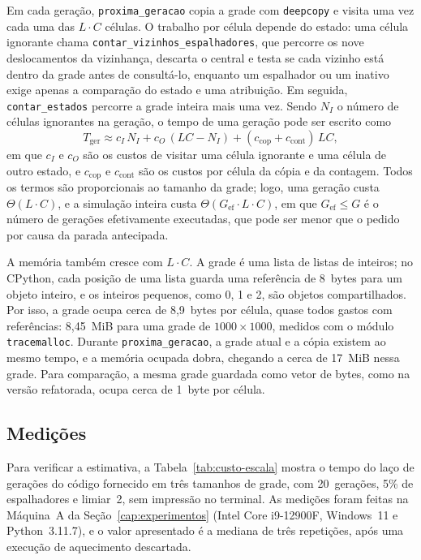 Em cada geração, \texttt{proxima\_geracao} copia a grade com \texttt{deepcopy} e visita uma vez cada uma das $L \cdot C$ células. O trabalho por célula depende do estado: uma célula ignorante chama \texttt{contar\_vizinhos\_espalhadores}, que percorre os nove deslocamentos da vizinhança, descarta o central e testa se cada vizinho está dentro da grade antes de consultá-lo, enquanto um espalhador ou um inativo exige apenas a comparação do estado e uma atribuição. Em seguida, \texttt{contar\_estados} percorre a grade inteira mais uma vez. Sendo $N_I$ o número de células ignorantes na geração, o tempo de uma geração pode ser escrito como
\begin{equation}\label{eq:custo-geracao}
    T_{\mathrm{ger}} \approx c_I \, N_I + c_O \, (L C - N_I) + (c_{\mathrm{cop}} + c_{\mathrm{cont}}) \, L C ,
\end{equation}
em que $c_I$ e $c_O$ são os custos de visitar uma célula ignorante e uma célula de outro estado, e $c_{\mathrm{cop}}$ e $c_{\mathrm{cont}}$ são os custos por célula da cópia e da contagem. Todos os termos são proporcionais ao tamanho da grade; logo, uma geração custa $\Theta(L \cdot C)$, e a simulação inteira custa $\Theta(G_{\mathrm{ef}} \cdot L \cdot C)$, em que $G_{\mathrm{ef}} \le G$ é o número de gerações efetivamente executadas, que pode ser menor que o pedido por causa da parada antecipada.

A memória também cresce com $L \cdot C$. A grade é uma lista de listas de inteiros; no CPython, cada posição de uma lista guarda uma referência de 8~bytes para um objeto inteiro, e os inteiros pequenos, como 0, 1 e 2, são objetos compartilhados. Por isso, a grade ocupa cerca de 8,9~bytes por célula, quase todos gastos com referências: 8,45~MiB para uma grade de $1000 \times 1000$, medidos com o módulo \texttt{tracemalloc}. Durante \texttt{proxima\_geracao}, a grade atual e a cópia existem ao mesmo tempo, e a memória ocupada dobra, chegando a cerca de 17~MiB nessa grade. Para comparação, a mesma grade guardada como vetor de bytes, como na versão refatorada, ocupa cerca de 1~byte por célula.

\subsection{Medições}\label{sub:custo-medicoes}

Para verificar a estimativa, a Tabela~\ref{tab:custo-escala} mostra o tempo do laço de gerações do código fornecido em três tamanhos de grade, com 20~gerações, 5\% de espalhadores e limiar~2, sem impressão no terminal. As medições foram feitas na Máquina~A da Seção~\ref{cap:experimentos} (Intel Core i9-12900F, Windows~11 e Python~3.11.7), e o valor apresentado é a mediana de três repetições, após uma execução de aquecimento descartada.

